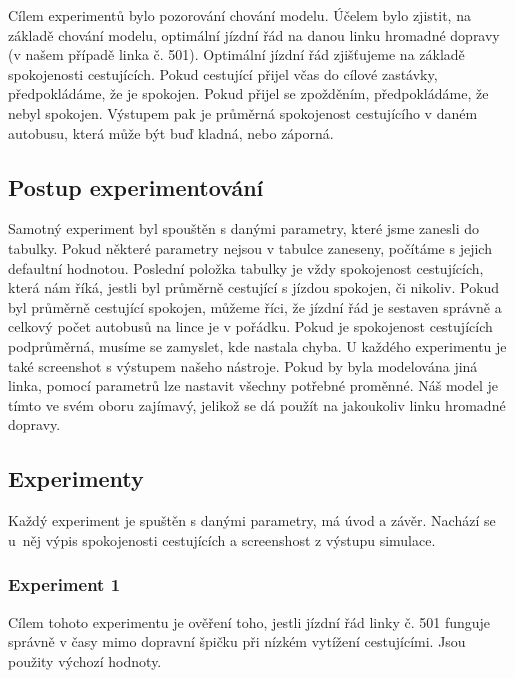 \documentclass[a4paper]{article}
\begin{document}
        Cílem experimentů bylo pozorování chování modelu.
        Účelem bylo zjistit, na základě chování modelu, optimální jízdní řád na danou linku hromadné dopravy (v našem případě linka č. 501). Optimální jízdní řád zjišťujeme na základě spokojenosti cestujících. Pokud cestující přijel včas do cílové zastávky, předpokládáme, že je spokojen. Pokud přijel se zpožděním, předpokládáme, že nebyl spokojen. Výstupem pak je průměrná spokojenost cestujícího v daném autobusu, která může být buď kladná, nebo záporná.

        \subsection{Postup experimentování}
        \label{subsec:experiments_methods}

            Samotný experiment byl spouštěn s danými parametry, které jsme zanesli do tabulky. Pokud některé parametry nejsou v tabulce zaneseny, počítáme s jejich defaultní hodnotou. Poslední položka tabulky je vždy spokojenost cestujících, která nám říká, jestli byl průměrně cestující s jízdou spokojen, či nikoliv. Pokud byl průměrně cestující spokojen, můžeme říci, že jízdní řád je sestaven správně a celkový počet autobusů na lince je v pořádku. Pokud je spokojenost cestujících podprůměrná, musíme se zamyslet, kde nastala chyba. U každého experimentu je také screenshot s výstupem našeho nástroje.
            Pokud by byla modelována jiná linka, pomocí parametrů lze nastavit všechny potřebné proměnné. Náš model je tímto ve svém oboru zajímavý, jelikož se dá použít na jakoukoliv linku hromadné dopravy.
        \newpage
        \subsection{Experimenty}
        \label{subsec:experiments}

            Každý experiment je spuštěn s danými parametry, má úvod a závěr. Nachází se u~něj výpis spokojenosti cestujících a screenshost z výstupu simulace.

            \subsubsection{Experiment 1}
            \label{subsubsec:experiment1}

                Cílem tohoto experimentu je ověření
                toho, jestli jízdní řád linky č. 501 \cite{Jizdni_rad} funguje správně v časy mimo dopravní špičku při nízkém vytížení cestujícími. Jsou použity výchozí hodnoty.
\end{document}
